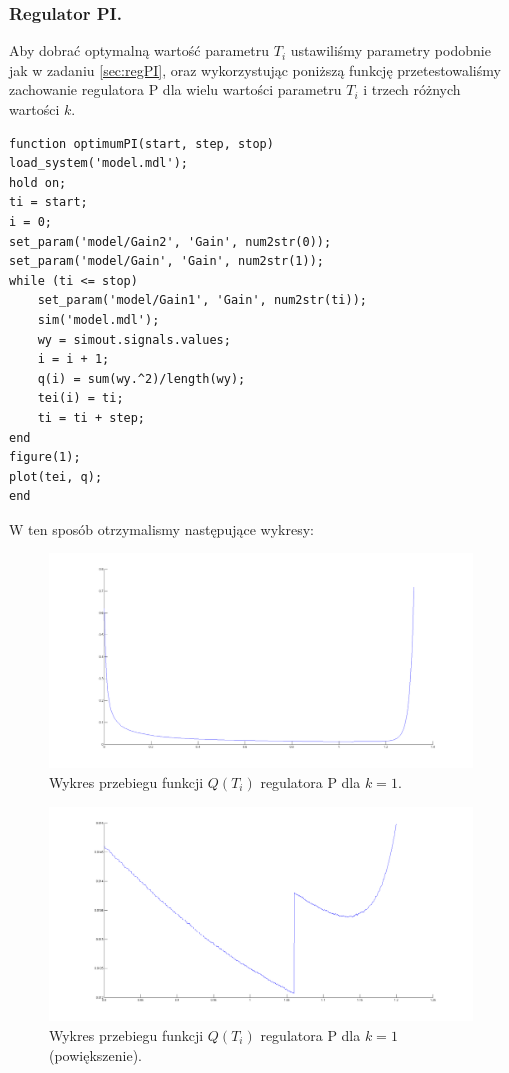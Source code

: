 \documentclass[a4paper,10pt]{article}
\begin{document}
\subsubsection{Regulator PI.}\label{sec:optPI}
Aby dobrać optymalną wartość parametru $T_{i}$ ustawiliśmy parametry podobnie jak w zadaniu \ref{sec:regPI}, oraz wykorzystując poniższą funkcję przetestowaliśmy zachowanie regulatora P dla wielu wartości parametru $T_{i}$ i trzech różnych wartości $k$. \\
\begin{lstlisting}[caption=Funkcja testująca regulator P.]
function optimumPI(start, step, stop)
load_system('model.mdl');
hold on;
ti = start;
i = 0;
set_param('model/Gain2', 'Gain', num2str(0));
set_param('model/Gain', 'Gain', num2str(1));
while (ti <= stop)
    set_param('model/Gain1', 'Gain', num2str(ti));
    sim('model.mdl');
    wy = simout.signals.values;
    i = i + 1;
    q(i) = sum(wy.^2)/length(wy);
    tei(i) = ti;
    ti = ti + step;
end
figure(1);
plot(tei, q);
end
\end{lstlisting}
W ten sposób otrzymalismy następujące wykresy: \\
\begin{figure}[!h]
    \centering
	\includegraphics[width=130mm]{CW2-regulatorPI-k1-opt1.png}
	\caption{Wykres przebiegu funkcji $Q(T_{i})$ regulatora P dla $k=1$.}
    \label{fig:regulatorPIk1opt1}
\end{figure}
\begin{figure}[!h]
    \centering
	\includegraphics[width=130mm]{CW2-regulatorPI-k1-opt2.png}
	\caption{Wykres przebiegu funkcji $Q(T_{i})$ regulatora P dla $k=1$ (powiększenie).}
    \label{fig:regulatorPIk1opt2}
\end{figure}
\end{document}

